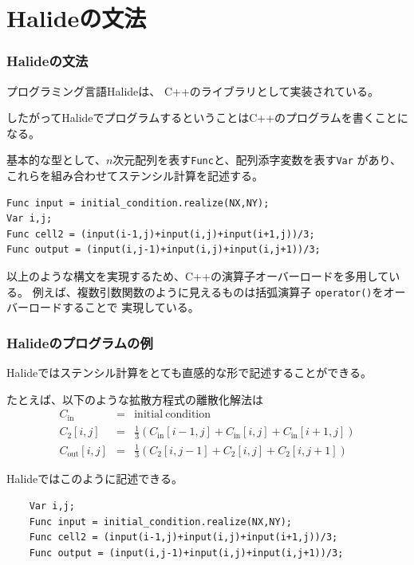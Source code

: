 \documentclass[dvipdfmx,cjk]{beamer}
\begin{document}
\section{Halideの文法} 
\begin{frame}[fragile]\frametitle{Halideの文法}

プログラミング言語Halideは、 C++のライブラリとして実装されている。

したがってHalideでプログラムするということはC++のプログラムを書くことになる。

基本的な型として、$n$次元配列を表す{\tt Func}と、配列添字変数を表す{\tt Var}
があり、これらを組み合わせてステンシル計算を記述する。

\pause

\begingroup
    \fontsize{8pt}{9pt}\selectfont
\begin{verbatim}
Func input = initial_condition.realize(NX,NY);
Var i,j;
Func cell2 = (input(i-1,j)+input(i,j)+input(i+1,j))/3;
Func output = (input(i,j-1)+input(i,j)+input(i,j+1))/3;
\end{verbatim}
\endgroup

\pause

以上のような構文を実現するため、C++の演算子オーバーロードを多用している。
例えば、複数引数関数のように見えるものは括弧演算子
{\tt operator()}をオーバーロードすることで
実現している。

\end{frame}


\begin{frame}[fragile]\frametitle{Halideのプログラムの例}

Halideではステンシル計算をとても直感的な形で記述することができる。

\pause

たとえば、以下のような拡散方程式の離散化解法は
\begin{eqnarray}
C_\mathrm{in} &=& \mathrm{initial~condition} \\
C_2 [i,j] &=& \frac{1}{3}\left(C_\mathrm{in}[i-1,j] + C_\mathrm{in}[i,j] + C_\mathrm{in}[i+1,j]\right) \\
C_\mathrm{out} [i,j] &=& \frac{1}{3}\left(C_\mathrm{2}[i,j-1] + C_\mathrm{2}[i,j] + C_\mathrm{2}[i,j+1]\right)
\end{eqnarray}

\pause

Halideではこのように記述できる。
\begin{center}
\begingroup
    \fontsize{9pt}{10pt}\selectfont
\begin{verbatim}
    Var i,j;
    Func input = initial_condition.realize(NX,NY);
    Func cell2 = (input(i-1,j)+input(i,j)+input(i+1,j))/3;
    Func output = (input(i,j-1)+input(i,j)+input(i,j+1))/3;
\end{verbatim}
\endgroup
\end{center}

\end{frame}
\end{document}
